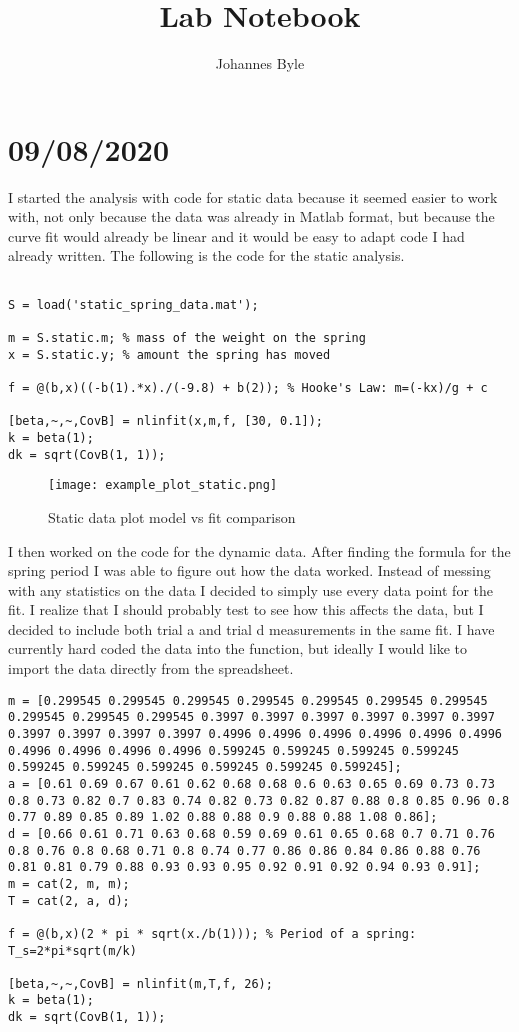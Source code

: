 \documentclass{article}
\title{Lab Notebook}
\author{Johannes Byle}
\begin{document}
    \maketitle

    \section*{09/08/2020}
    I started the analysis with code for static data because it seemed easier to work with, not only because the data was already in Matlab format, but because the curve fit would already be linear and it would be easy to adapt code I had already written. The following is the code for the static analysis.
    \begin{lstlisting}

S = load('static_spring_data.mat');

m = S.static.m; % mass of the weight on the spring
x = S.static.y; % amount the spring has moved

f = @(b,x)((-b(1).*x)./(-9.8) + b(2)); % Hooke's Law: m=(-kx)/g + c

[beta,~,~,CovB] = nlinfit(x,m,f, [30, 0.1]);
k = beta(1);
dk = sqrt(CovB(1, 1));
    \end{lstlisting}
    \begin{figure}
        \centering
        \texttt{[image: example\_plot\_static.png]}
        \caption{Static data plot model vs fit comparison}
    \end{figure}
    I then worked on the code for the dynamic data. After finding the formula for the spring period I was able to figure out how the data worked. Instead of messing with any statistics on the data I decided to simply use every data point for the fit. I realize that I should probably test to see how this affects the data, but I decided to include both trial a and trial d measurements in the same fit. I have currently hard coded the data into the function, but ideally I would like to import the data directly from the spreadsheet.
    \begin{lstlisting}
m = [0.299545 0.299545 0.299545 0.299545 0.299545 0.299545 0.299545 0.299545 0.299545 0.299545 0.3997 0.3997 0.3997 0.3997 0.3997 0.3997 0.3997 0.3997 0.3997 0.3997 0.4996 0.4996 0.4996 0.4996 0.4996 0.4996 0.4996 0.4996 0.4996 0.4996 0.599245 0.599245 0.599245 0.599245 0.599245 0.599245 0.599245 0.599245 0.599245 0.599245];
a = [0.61 0.69 0.67 0.61 0.62 0.68 0.68 0.6 0.63 0.65 0.69 0.73 0.73 0.8 0.73 0.82 0.7 0.83 0.74 0.82 0.73 0.82 0.87 0.88 0.8 0.85 0.96 0.8 0.77 0.89 0.85 0.89 1.02 0.88 0.88 0.9 0.88 0.88 1.08 0.86];
d = [0.66 0.61 0.71 0.63 0.68 0.59 0.69 0.61 0.65 0.68 0.7 0.71 0.76 0.8 0.76 0.8 0.68 0.71 0.8 0.74 0.77 0.86 0.86 0.84 0.86 0.88 0.76 0.81 0.81 0.79 0.88 0.93 0.93 0.95 0.92 0.91 0.92 0.94 0.93 0.91];
m = cat(2, m, m);
T = cat(2, a, d);

f = @(b,x)(2 * pi * sqrt(x./b(1))); % Period of a spring: T_s=2*pi*sqrt(m/k)

[beta,~,~,CovB] = nlinfit(m,T,f, 26);
k = beta(1);
dk = sqrt(CovB(1, 1));
    \end{lstlisting}
\end{document}
